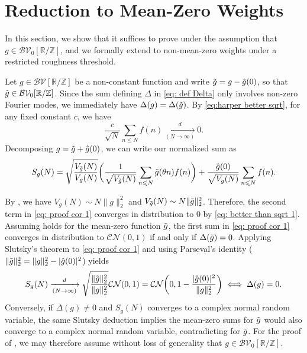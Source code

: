 \documentclass[12pt]{amsart}
\renewcommand{\leq}{\leqslant}
\numberwithin{equation}{section}
\theoremstyle{plain}
\theoremstyle{definition}
\newcommand{\Z}{\mathbb{Z}}
\newcommand{\R}{\mathbb{R}}
\newcommand{\CB}{\mathcal{B}}
\newcommand{\CC}{\mathcal{C}}
\newcommand{\CN}{\mathcal{N}}
\newcommand{\CV}{\mathcal{V}}
\begin{document}
	\section{Reduction to Mean-Zero Weights}\label{sec:reduction}
	In this section, we show that it suffices to prove  under the assumption that $g \in \CB\CV_0[\R/\Z]$, and we formally extend  to non-mean-zero weights under a restricted roughness threshold. 
	
	Let $g \in \CB\CV[\R/\Z]$ be a non-constant function and write $\Tilde{g} = g - \hat{g}(0)$, so that $\Tilde{g} \in \CB\CV_0[\R/\Z]$. Since the sum defining $\Delta$ in \eqref{eq: def Delta} only involves non-zero Fourier modes, we immediately have $\Delta(g) = \Delta(\Tilde{g})$. By \eqref{eq:harper better sqrt}, for any fixed constant $c$, we have
	\begin{equation}\label{eq: better than sqrt 1}
		\frac{c}{\sqrt{N}}\sum_{n \leq N} f(n) \xrightarrow[(N \to \infty)]{d} 0.
	\end{equation}
	Decomposing $g = \Tilde{g} + \hat{g}(0)$, we can write our normalized sum as
	\begin{equation}\label{eq: proof cor 1}
		S_{g}(N) = \sqrt{\frac{V_{\Tilde{g}}(N)}{V_{g}(N)}}\bigg(\frac{1}{\sqrt{V_{\Tilde{g}}(N)}}\sum_{n \leq N}\Tilde{g}(\theta n) f(n)\bigg) + \frac{\hat{g}(0)}{\sqrt{V_{g}(N)}}\sum_{n \leq N} f(n).
	\end{equation}
	
	By , we have $V_{g}(N) \sim N \|g\|_2^2$ and $V_{\Tilde{g}}(N) \sim N \|\Tilde{g}\|_2^2$. Therefore, the second term in \eqref{eq: proof cor 1} converges in distribution to $0$ by \eqref{eq: better than sqrt 1}. Assuming  holds for the mean-zero function $\Tilde{g}$, the first sum in \eqref{eq: proof cor 1} converges in distribution to $\CC\CN(0,1)$ if and only if $\Delta(\Tilde{g}) = 0$. Applying Slutsky's theorem to \eqref{eq: proof cor 1} and using Parseval's identity ($\|\Tilde{g}\|_2^2 = \|g\|_2^2 - |\hat{g}(0)|^2$) yields
	\begin{equation*}
		S_{g}(N) \xrightarrow[(N \to \infty)]{d}  \sqrt{ \frac{\|\Tilde{g}\|_2^2}{\|g\|_2^2} }\CC\CN(0,1) = \CC\CN\bigg(0,1-\frac{|\hat{g}(0)|^2}{\|g\|_2^2}\bigg) \iff \Delta(g) = 0.
	\end{equation*}
	Conversely, if $\Delta(g) \ne 0$ and $S_g(N)$ converges to a complex normal random variable, the same Slutsky deduction implies the mean-zero sums for $\Tilde{g}$ would also converge to a complex normal random variable, contradicting  for $\Tilde{g}$. For the proof of , we may therefore assume without loss of generality that $g \in \CB\CV_0[\R/\Z]$.
	
\end{document}
